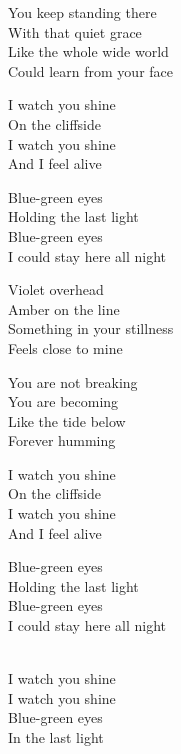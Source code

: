 \begin{lyrics}
You keep standing there\\
With that quiet grace\\
Like the whole wide world\\
Could learn from your face

I watch you shine\\
On the cliffside\\
I watch you shine\\
And I feel alive

Blue-green eyes\\
Holding the last light\\
Blue-green eyes\\
I could stay here all night

Violet overhead\\
Amber on the line\\
Something in your stillness\\
Feels close to mine

You are not breaking\\
You are becoming\\
Like the tide below\\
Forever humming

I watch you shine\\
On the cliffside\\
I watch you shine\\
And I feel alive

Blue-green eyes\\
Holding the last light\\
Blue-green eyes\\
I could stay here all night

\\
I watch you shine\\
I watch you shine\\
Blue-green eyes\\
In the last light
\end{lyrics}

